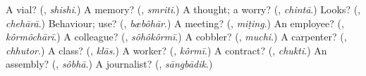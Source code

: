\begin{tcolorbox}[breakable,colback=teal!4,colframe=teal!35!black,title={Before you move on}]
A vial? (\textbf{}, \emph{shishi}.) A memory? (\textbf{}, \emph{smriti}.) A thought; a worry? (\textbf{}, \emph{chintā}.) Looks? (\textbf{}, \emph{chehārā}.) Behaviour; use? (\textbf{}, \emph{bæbôhār}.) A meeting? (\textbf{}, \emph{miṭing}.) An employee? (\textbf{}, \emph{kôrmôchārī}.) A colleague? (\textbf{}, \emph{sôhôkôrmī}.) A cobbler? (\textbf{}, \emph{muchi}.) A carpenter? (\textbf{}, \emph{chhutor}.) A class? (\textbf{}, \emph{klās}.) A worker? (\textbf{}, \emph{kôrmī}.) A contract? (\textbf{}, \emph{chukti}.) An assembly? (\textbf{}, \emph{sôbhā}.) A journalist? (\textbf{}, \emph{sāngbādik}.)
\end{tcolorbox}
